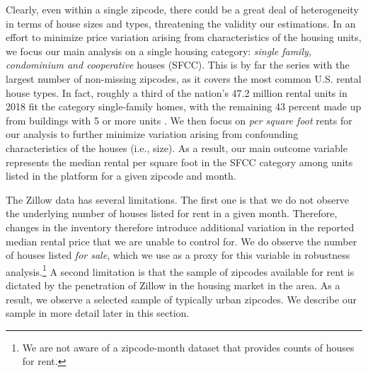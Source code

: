 Clearly, even within a single zipcode, there could be a great deal of heterogeneity in 
terms of house sizes and types, threatening the validity our estimations. In an effort 
to minimize price variation arising from characteristics of the housing units, we focus 
our main analysis on a single housing category: \textit{single family, condominium and 
cooperative} houses (SFCC). This is by far the series with the largest number of 
non-missing zipcodes, as it covers the most common U.S. rental house types. In fact, 
roughly a third of the nation's 47.2 million rental units in 2018 fit the category 
single-family homes, with the remaining 43 percent made up from buildings with 5 or more 
units \parencite{fernald2020americas}. We then focus on \textit{per square foot} rents 
for our analysis to further minimize variation arising from confounding characteristics
of the houses (i.e., size). As a result, our main outcome variable represents the median 
rental per square foot in the SFCC category among units listed in the platform for a 
given zipcode and month. 

The Zillow data has several limitations. The first one is that we do not observe the 
underlying number of houses listed for rent in a given month. Therefore, changes in the 
inventory therefore introduce additional variation in the reported median rental price 
that we are unable to control for. We do observe the number of houses listed \textit{for 
sale}, which we use as a proxy for this variable in robustness analysis.\footnote{We 
	are not aware of a zipcode-month dataset that provides counts of houses for rent.}
A second limitation is that the sample of zipcodes 
available for rent is dictated by the penetration of Zillow in the housing market in the 
area. As a result, we observe a selected sample of typically urban zipcodes. We describe 
our sample in more detail later in this section.

